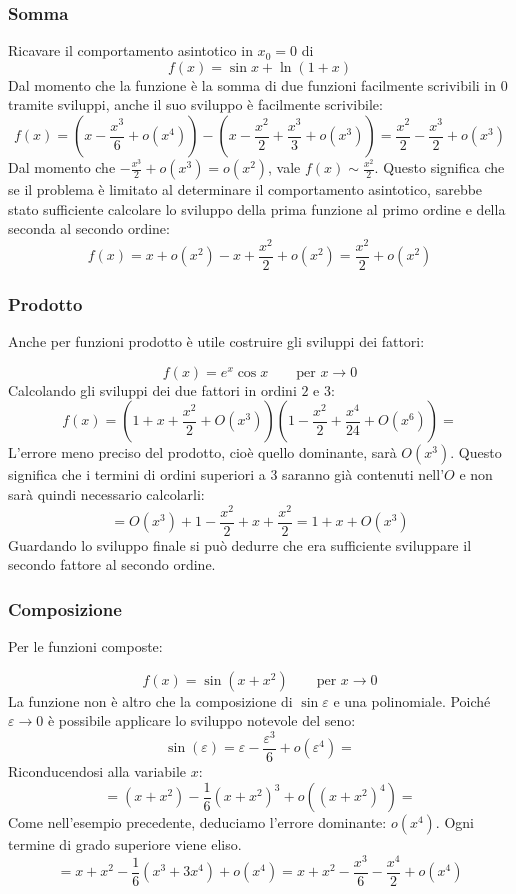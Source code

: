 \subsubsection{Somma}
\begin{examp}
	Ricavare il comportamento asintotico in $x_0=0$ di
	\[
		f(x)=\sin x+\ln(1+x)
	\]
	Dal momento che la funzione è la somma di due funzioni facilmente scrivibili in $0$ tramite sviluppi, anche il suo sviluppo è facilmente scrivibile:
	\[
		f(x)=\left(x-\frac{x^3}{6}+o(x^4)\right)-\left(x-\frac{x^2}{2}+\frac{x^3}{3}+o(x^3)\right)=\frac{x^2}{2}-\frac{x^3}{2}+o(x^3)
	\]
	Dal momento che $-\frac{x^3}{2}+o(x^3)=o(x^2)$, vale $f(x)\sim \frac{x^2}{2}$. Questo significa che se il problema è limitato al determinare il comportamento asintotico, sarebbe stato sufficiente calcolare lo sviluppo della prima funzione al primo ordine e della seconda al secondo ordine:
	\[
		f(x)=x+o(x^2)-x+\frac{x^2}{2}+o(x^2)=\frac{x^2}{2}+o(x^2)
	\]
\end{examp}

\subsubsection{Prodotto}
Anche per funzioni prodotto è utile costruire gli sviluppi dei fattori:
\begin{examp}
	\[
		f(x)=e^x\cos x\qquad\text{per $x\to0$}
	\]
	Calcolando gli sviluppi dei due fattori in ordini $2$ e $3$:
	\[
		f(x)=\left(1+x+\frac{x^2}{2}+O(x^3)\right)\left(1-\frac{x^2}{2}+\frac{x^4}{24}+O(x^6)\right)=
	\]
	L'errore meno preciso del prodotto, cioè quello dominante, sarà $O(x^3)$. Questo significa che i termini di ordini superiori a $3$ saranno già contenuti nell'$O$ e non sarà quindi necessario calcolarli:
	\[
		=O(x^3)+1-\frac{x^2}{2}+x+\frac{x^2}{2}=1+x+O(x^3)
	\]
	Guardando lo sviluppo finale si può dedurre che era sufficiente sviluppare il secondo fattore al secondo ordine.
\end{examp}

\subsubsection{Composizione}
Per le funzioni composte:
\begin{examp}
	\[
		f(x)=\sin(x+x^2)\qquad\text{per $x\to0$}
	\]
	La funzione non è altro che la composizione di $\sin \varepsilon$ e una polinomiale. Poiché $\varepsilon\to0$ è possibile applicare lo sviluppo notevole del seno:
	\[
		\sin(\varepsilon)=\varepsilon-\frac{\varepsilon^3}{6}+o(\varepsilon^4)=
	\]
	Riconducendosi alla variabile $x$:
	\[
		=(x+x^2)-\frac{1}{6}(x+x^2)^3+o((x+x^2)^4)=
	\]
	Come nell'esempio precedente, deduciamo l'errore dominante: $o(x^4)$. Ogni termine di grado superiore viene eliso.
	\[
		=x+x^2-\frac{1}{6}(x^3+3x^4)+o(x^4)=x+x^2-\frac{x^3}{6}-\frac{x^4}{2}+o(x^4)
	\]
\end{examp}

